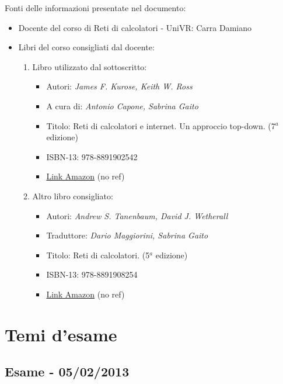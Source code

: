 \documentclass[a4paper]{article}
\begin{document}
	\noindent
	Fonti delle informazioni presentate nel documento:
	\begin{itemize}
		\item Docente del corso di \textsf{Reti di calcolatori} - UniVR: Carra Damiano
		
		\item Libri del corso consigliati dal docente:
		\begin{enumerate}
			\item Libro utilizzato dal sottoscritto:
			\begin{itemize}
				\item Autori: \emph{James F. Kurose, Keith W. Ross}
				\item A cura di: \emph{Antonio Capone, Sabrina Gaito}
				\item Titolo: \textsf{Reti di calcolatori e internet. Un approccio top-down. (7$^{a}$ edizione)}
				\item ISBN-13: 978-8891902542
				\item \href{https://amzn.eu/d/aVADZYD}{Link Amazon} (no ref)
			\end{itemize}
		
			\item Altro libro consigliato:
			\begin{itemize}
				\item Autori: \emph{Andrew S. Tanenbaum, David J. Wetherall}
				\item Traduttore: \emph{Dario Maggiorini, Sabrina Gaito}
				\item Titolo: \textsf{Reti di calcolatori. (5$^{a}$ edizione)}
				\item ISBN-13: 978-8891908254
				\item \href{https://amzn.eu/d/fC9FpsB}{Link Amazon} (no ref)
			\end{itemize}
		\end{enumerate}
	\end{itemize}\newpage
	
	\section{Temi d'esame}
	
	\subsection[\textbf{Esame - 05/02/2013}]{Esame - 05/02/2013}
	
\end{document}
